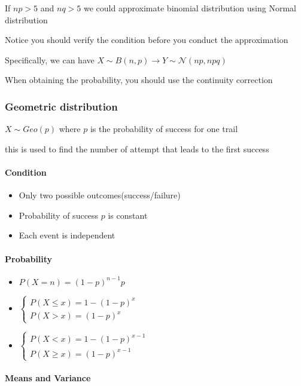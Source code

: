 \documentclass[]{article}
\let\oldparagraph\paragraph
\renewcommand{\paragraph}[1]{\oldparagraph{#1}\mbox{}}
\begin{document}
If \(np>5\) and \(nq > 5\) we could approximate binomial distribution
using Normal distribution

Notice you should verify the condition before you conduct the
approximation

Specifically, we can have
\(X \sim B(n,p) \rightarrow Y \sim \mathcal{N}(np, npq)\)

When obtaining the probability, you should use the continuity correction

\subsubsection{Geometric distribution}\label{header-n75}

\(X \sim Geo(p)\) where \(p\) is the probability of success for one
trail

this is used to find the number of attempt that leads to the first
success

\paragraph{Condition}\label{header-n77}

\begin{itemize}
\item
  Only two possible outcomes(success/failure)
\item
  Probability of success \(p\) is constant
\item
  Each event is independent
\end{itemize}

\paragraph{Probability}\label{header-n79}

\begin{itemize}
\item
  \(P(X = n) = (1-p)^{n-1}p\)
\item
  \(\begin{cases}P(X \le x) = 1-(1-p)^x \\ P(X > x) = (1-p)^x\end{cases}\)
\item
  \(\begin{cases}P(X < x) = 1-(1-p)^{x-1} \\ P(X \ge x) = (1-p)^{x-1}\end{cases}\)
\end{itemize}

\paragraph{Means and Variance}\label{header-n85}
\end{document}
